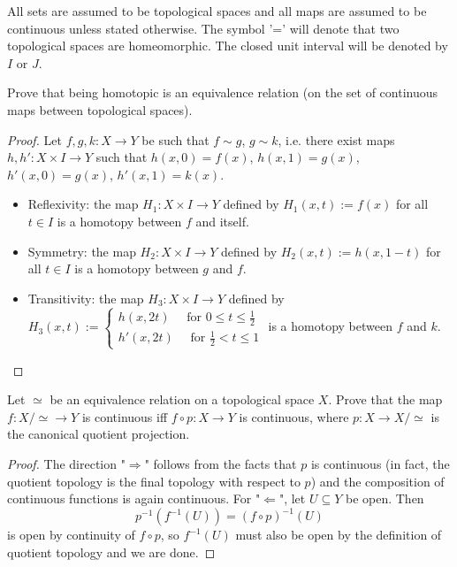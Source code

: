 \documentclass[12pt,a4paper]{article}
\begin{document}
\pagestyle{fancy}                      %
\fancyhf{}                             %
\addtolength{\topmargin}{-30 pt}                   %
\setlength{\headsep}{10 pt}                      %
\renewcommand{\headrulewidth}{1 pt}                %
\renewcommand*{\proofname}{Solution}

\rem All sets are assumed to be topological spaces and all maps are assumed to be continuous unless stated otherwise. The symbol '=' will denote that two topological spaces are homeomorphic. The closed unit interval will be denoted by $I$ or $J$.

\ex Prove that being homotopic is an equivalence relation (on the set of continuous maps between topological spaces).
\begin{proof} Let $f,g,k:X\to Y$ be such that $f\sim g$, $g\sim k$, i.e. there exist maps $h,h':X\times I\to Y$ such that $h(x,0)=f(x)$, $h(x,1)=g(x)$, $h'(x,0)=g(x)$, $h'(x,1)=k(x)$.
\begin{itemize}
\item Reflexivity: the map $H_1:X\times I\to Y$ defined by $H_1(x,t):=f(x)$ for all $t\in I$ is a homotopy between $f$ and itself.
\item Symmetry: the map $H_2:X\times I\to Y$ defined by $H_2(x,t):=h(x,1-t)$ for all $t\in I$ is a homotopy between $g$ and $f$.
\item Transitivity: the map $H_3:X\times I\to Y$ defined by $H_3(x,t):=
\begin{cases}
h(x,2t)\quad \text{ for } 0\leq t \leq \frac{1}{2}\\
h'(x,2t)\quad \text{ for } \frac{1}{2} < t \leq 1
\end{cases}
$ is a homotopy between $f$ and $k$.
\end{itemize}
\end{proof}

\ex Let $\simeq$ be an equivalence relation on a topological space $X$. Prove that the map $f:X/\simeq \to Y$ is continuous iff $f\circ p:X\to Y$ is continuous, where $p:X\to X/\simeq$ is the canonical quotient projection.
\begin{proof}
The direction "$\Rightarrow$" follows from the facts that $p$ is continuous (in fact, the quotient topology is the final topology with respect to $p$) and the composition of continuous functions is again continuous. For "$\Leftarrow$", let $U\subseteq Y$ be open. Then $$p^{-1}(f^{-1}(U))=(f\circ p)^{-1}(U)$$ is open by continuity of $f\circ p$, so $f^{-1}(U)$ must also be open by the definition of quotient topology and we are done.
\end{proof}
\end{document}

